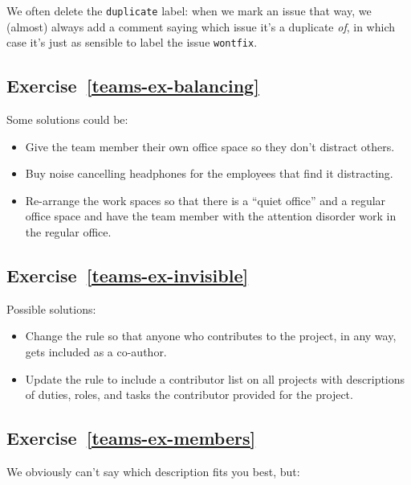 \documentclass[
]{krantz}
\providecommand{\tightlist}{%
  \setlength{\itemsep}{0pt}\setlength{\parskip}{0pt}}
\begin{document}
We often delete the \texttt{duplicate} label:
when we mark an issue that way,
we (almost) always add a comment saying which issue it's a duplicate \emph{of},
in which case it's just as sensible to label the issue \texttt{wontfix}.

\hypertarget{exercise-refteams-ex-balancing}{%
\subsection*{Exercise~\ref{teams-ex-balancing}}\label{exercise-refteams-ex-balancing}}


Some solutions could be:

\begin{itemize}
\tightlist
\item
  Give the team member their own office space so they don't distract others.
\item
  Buy noise cancelling headphones for the employees that find it distracting.
\item
  Re-arrange the work spaces so that there is a ``quiet office'' and a regular
  office space and have the team member with the attention disorder work
  in the regular office.
\end{itemize}

\hypertarget{exercise-refteams-ex-invisible}{%
\subsection*{Exercise~\ref{teams-ex-invisible}}\label{exercise-refteams-ex-invisible}}


Possible solutions:

\begin{itemize}
\tightlist
\item
  Change the rule so that anyone who contributes to the project, in any way,
  gets included as a co-author.
\item
  Update the rule to include a contributor list on all projects with descriptions
  of duties, roles, and tasks the contributor provided for the project.
\end{itemize}

\hypertarget{exercise-refteams-ex-members}{%
\subsection*{Exercise~\ref{teams-ex-members}}\label{exercise-refteams-ex-members}}


We obviously can't say which description fits you best, but:
\end{document}
